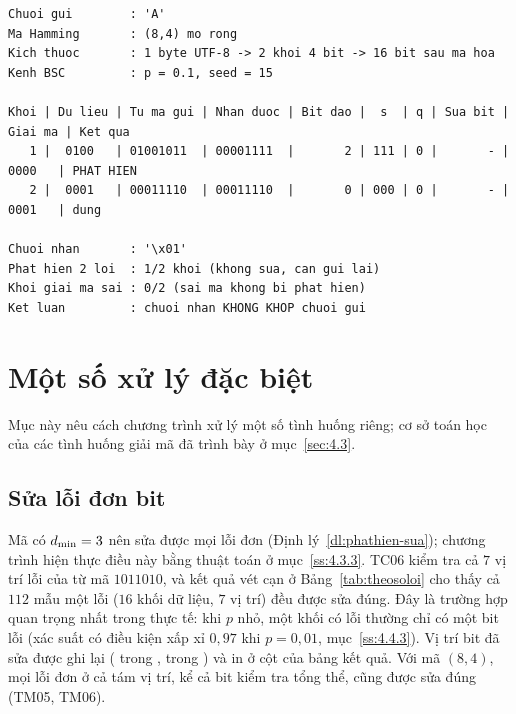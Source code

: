 \par\medskip\noindent
\begin{minipage}{\linewidth}
\label{lst:chay-a84}
\end{minipage}
\par\nopagebreak
\begin{Verbatim}[fontsize=\scriptsize]
Chuoi gui        : 'A'
Ma Hamming       : (8,4) mo rong
Kich thuoc       : 1 byte UTF-8 -> 2 khoi 4 bit -> 16 bit sau ma hoa
Kenh BSC         : p = 0.1, seed = 15

Khoi | Du lieu | Tu ma gui | Nhan duoc | Bit dao |  s  | q | Sua bit | Giai ma | Ket qua
   1 |  0100   | 01001011  | 00001111  |       2 | 111 | 0 |       - |  0000   | PHAT HIEN
   2 |  0001   | 00011110  | 00011110  |       0 | 000 | 0 |       - |  0001   | dung

Chuoi nhan       : '\x01'
Phat hien 2 loi  : 1/2 khoi (khong sua, can gui lai)
Khoi giai ma sai : 0/2 (sai ma khong bi phat hien)
Ket luan         : chuoi nhan KHONG KHOP chuoi gui
\end{Verbatim}

\section{Một số xử lý đặc biệt}
\label{sec:4.6}

Mục này nêu cách chương trình xử lý một số tình huống riêng; cơ sở toán học của
các tình huống giải mã đã trình bày ở mục~\ref{sec:4.3}.

\subsection{Sửa lỗi đơn bit}
\label{ss:4.6.1}

Mã có $d_{\min} = 3$ nên sửa được mọi lỗi đơn (Định lý~\ref{dl:phathien-sua});
chương trình hiện thực điều này bằng thuật toán ở mục~\ref{ss:4.3.3}. TC06 kiểm
tra cả $7$ vị trí lỗi của từ mã $1011010$, và kết quả vét cạn ở
Bảng~\ref{tab:theosoloi} cho thấy cả $112$ mẫu một lỗi ($16$ khối dữ liệu,
$7$ vị trí) đều được sửa đúng. Đây là trường hợp quan trọng nhất trong thực tế:
khi $p$ nhỏ, một khối có lỗi thường chỉ có một bit lỗi (xác suất có điều kiện
xấp xỉ $0{,}97$ khi $p = 0{,}01$, mục~\ref{ss:4.4.3}). Vị trí bit đã sửa được ghi lại
( trong , 
trong ) và in ở cột  của bảng kết quả. Với mã
$(8,4)$, mọi lỗi đơn ở cả tám vị trí, kể cả bit kiểm tra tổng thể, cũng được sửa
đúng (TM05, TM06).

